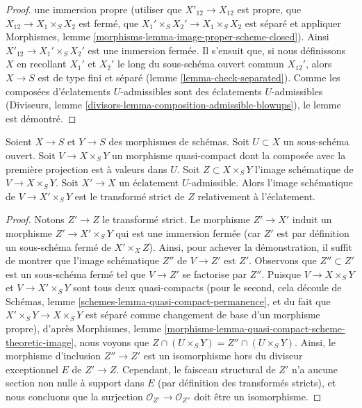 \begin{proof}
une immersion propre (utiliser que $X'_{12} \to X_{12}$ est propre,
que $X_{12} \to X_1 \times_S X_2$ est fermé, que $X_1' \times_S X_2' \to
X_1 \times_S X_2$ est séparé et appliquer Morphismes, lemme
\ref{morphisms-lemma-image-proper-scheme-closed}).
Ainsi $X'_{12} \to  X_1' \times_S X_2'$ est une immersion fermée.
Il s'ensuit que, si nous définissons $X$ en recollant $X_1'$ et $X_2'$
le long du sous-schéma ouvert commun $X_{12}'$, alors $X \to S$ est de type fini
et séparé (lemme \ref{lemma-check-separated}).
Comme les composées d'éclatements $U$-admissibles sont des éclatements $U$-admissibles
(Diviseurs, lemme \ref{divisors-lemma-composition-admissible-blowups}),
le lemme est démontré.
\end{proof}

\begin{lemma}
\label{lemma-replaced-by-strict-transform}
Soient $X \to S$ et $Y \to S$ des morphismes de schémas.
Soit $U \subset X$ un sous-schéma ouvert.
Soit $V \to X \times_S Y$ un morphisme quasi-compact
dont la composée avec la première projection est à valeurs dans $U$.
Soit $Z \subset X \times_S Y$ l'image schématique de
$V \to X \times_S Y$. Soit $X' \to X$ un éclatement $U$-admissible.
Alors l'image schématique de $V \to X' \times_S Y$ est le
transformé strict de $Z$ relativement à l'éclatement.
\end{lemma}

\begin{proof}
Notons $Z' \to Z$ le transformé strict. Le morphisme $Z' \to X'$
induit un morphisme $Z' \to X' \times_S Y$ qui est une immersion fermée
(car $Z'$ est par définition un sous-schéma fermé de $X' \times_X Z$).
Ainsi, pour achever la démonstration, il suffit de montrer que l'image schématique
$Z''$ de $V \to Z'$ est $Z'$. Observons que $Z'' \subset Z'$
est un sous-schéma fermé tel que $V \to Z'$ se factorise par $Z''$.
Puisque $V \to X \times_S Y$ et $V \to X' \times_S Y$ sont tous deux
quasi-compacts (pour le second, cela découle de Schémas, lemme
\ref{schemes-lemma-quasi-compact-permanence},
et du fait que $X' \times_S Y \to X \times_S Y$ est séparé
comme changement de base d'un morphisme propre), d'après Morphismes, lemme
\ref{morphisms-lemma-quasi-compact-scheme-theoretic-image},
nous voyons que $Z \cap (U \times_S Y) = Z'' \cap (U \times_S Y)$.
Ainsi, le morphisme d'inclusion $Z'' \to Z'$ est un isomorphisme
hors du diviseur exceptionnel $E$ de $Z' \to Z$. Cependant, le
faisceau structural de $Z'$ n'a aucune section non nulle à support
dans $E$ (par définition des transformés stricts), et nous concluons que
la surjection $\mathcal{O}_{Z'} \to \mathcal{O}_{Z''}$
doit être un isomorphisme.
\end{proof}

